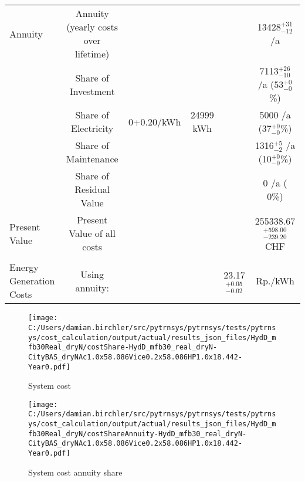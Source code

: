 \documentclass[english]{SPFShortReport}
\begin{document}
\begin{table}[!ht]
\begin{adjustbox}{max width =\textwidth}
\begin{tabular}{l | c c c c c }
Annuity & Annuity (yearly costs over lifetime)  &&& & 13428$^{\mathrm{+31}}_{\mathrm{-12}}$ /a  \\
 & Share of Investment & &&& 7113$^{\mathrm{+26}}_{\mathrm{-10}}$ /a (53$^{\mathrm{+ 0}}_{\mathrm{- 0}}$\%) \\
 & Share of Electricity & 0+0.20/kWh & 24999 kWh &  & 5000 /a (37$^{\mathrm{+ 0}}_{\mathrm{- 0}}$\%)\\
 & Share of Maintenance & &&& 1316$^{\mathrm{+ 5}}_{\mathrm{- 2}}$ /a (10$^{\mathrm{+ 0}}_{\mathrm{- 0}}$\%)\\ 
 & Share of Residual Value &&& &  0 /a ( 0\%)\\
Present Value  & Present Value of all costs  & &&& 255338.67$^{\mathrm{+598.00}}_{\mathrm{-239.20}}$ CHF \\
\hline \\ 
 Energy Generation Costs & Using annuity: &&& 23.17$^{\mathrm{+0.05}}_{\mathrm{-0.02}}$ & Rp./kWh \\
\hline
\hline
\end{tabular}
\end{adjustbox}
\label{CostsTable}
\end{table}
\begin{figure}[!htbp]
\begin{center}
\texttt{[image: C:/Users/damian.birchler/src/pytrnsys/pytrnsys/tests/pytrnsys/cost\_calculation/output/actual/results\_json\_files/HydD\_mfb30Real\_dryN/costShare-HydD\_mfb30\_real\_dryN-CityBAS\_dryNAc1.0x58.086Vice0.2x58.086HP1.0x18.442-Year0.pdf]}
\caption{System cost}
\label{systemCost}
\end{center}
\end{figure}
\begin{figure}[!htbp]
\begin{center}
\texttt{[image: C:/Users/damian.birchler/src/pytrnsys/pytrnsys/tests/pytrnsys/cost\_calculation/output/actual/results\_json\_files/HydD\_mfb30Real\_dryN/costShareAnnuity-HydD\_mfb30\_real\_dryN-CityBAS\_dryNAc1.0x58.086Vice0.2x58.086HP1.0x18.442-Year0.pdf]}
\caption{System cost annuity share}
\label{systemCostannuity}
\end{center}
\end{figure}
\end{document}
